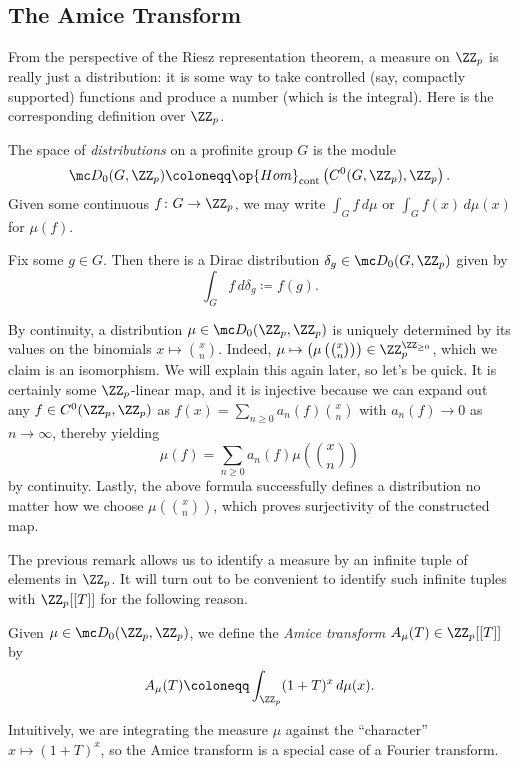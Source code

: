 \documentclass{article}
\begin{document}
\subsection{The Amice Transform}
From the perspective of the Riesz representation theorem, a measure on $\ZZ_p$ is really just a distribution: it is some way to take controlled (say, compactly supported) functions and produce a number (which is the integral). Here is the corresponding definition over $\ZZ_p$.
\begin{definition}[distribution]
	The space of \textit{distributions} on a profinite group $G$ is the module
	\[\mc D_0(G,\ZZ_p)\coloneqq\op{Hom}_{\mathrm{cont}}\left(C^0(G,\ZZ_p),\ZZ_p\right).\]
	Given some continuous $f\colon G\to\ZZ_p$, we may write $\int_G f\,d\mu$ or $\int_{G}f(x)\,d\mu(x)$ for $\mu(f)$.
\end{definition}
\begin{example}
	Fix some $g\in G$. Then there is a Dirac distribution $\delta_g\in\mc D_0(G,\ZZ_p)$ given by
	\[\int_Gf\,d\delta_g\coloneqq f(g).\]
\end{example}
\begin{remark}
	By continuity, a distribution $\mu\in\mc D_0(\ZZ_p,\ZZ_p)$ is uniquely determined by its values on the binomials $x\mapsto\binom xn$. Indeed, $\mu\mapsto\left(\mu\left(\binom xn\right)\right)\in\ZZ_p^{\ZZ_{\ge0}}$, which we claim is an isomorphism. We will explain this again later, so let's be quick. It is certainly some $\ZZ_p$-linear map, and it is injective because we can expand out any $f\in C^0(\ZZ_p,\ZZ_p)$ as $f(x)=\sum_{n\ge0}a_n(f)\binom xn$ with $a_n(f)\to0$ as $n\to\infty$, thereby yielding
	\[\mu(f)=\sum_{n\ge0}a_n(f)\mu\left(\binom xn\right)\]
	by continuity. Lastly, the above formula successfully defines a distribution no matter how we choose $\mu\left(\binom xn\right)$, which proves surjectivity of the constructed map.
\end{remark}
The previous remark allows us to identify a measure by an infinite tuple of elements in $\ZZ_p$. It will turn out to be convenient to identify such infinite tuples with $\ZZ_p[[T]]$ for the following reason.
\begin{definition}
	Given $\mu\in\mc D_0(\ZZ_p,\ZZ_p)$, we define the \textit{Amice transform} $A_\mu(T)\in\ZZ_p[[T]]$ by
	\[A_\mu(T)\coloneqq\int_{\ZZ_p}(1+T)^x\,d\mu(x).\]
\end{definition}
\begin{remark}
	Intuitively, we are integrating the measure $\mu$ against the ``character'' $x\mapsto(1+T)^x$, so the Amice transform is a special case of a Fourier transform.
\end{remark}
\end{document}
